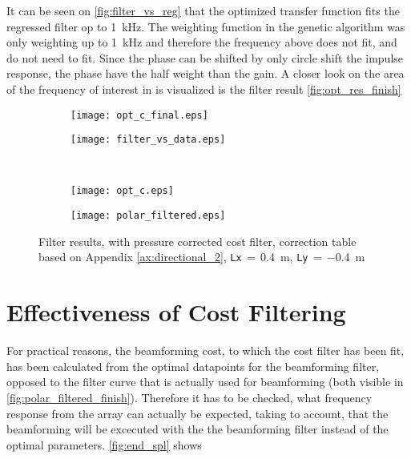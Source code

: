 It can be seen on \autoref{fig:filter_vs_reg} that the optimized transfer function fits the regressed filter op to \SI{1}{\kilo\hertz}. The weighting function in the genetic algorithm was only weighting up to \SI{1}{\kilo\hertz} and therefore the frequency above does not fit, and do not need to fit. Since the phase can be shifted by only circle shift the impulse response, the phase have the half weight than the gain.  A closer look on the area of the frequency of interest in is visualized is the filter result \autoref{fig:opt_res_finish}


\begin{figure}[H]
\begin{subfigure}[c]{0.5\textwidth}
\texttt{[image: opt\_c\_final.eps]}
\label{fig:opt_res_a_finish}
\end{subfigure}
\begin{subfigure}[c]{0.5\textwidth}
\texttt{[image: filter\_vs\_data.eps]}
\label{fig:filter_vs_data_finish}
\end{subfigure}\\
\hspace{0.1\textheight}
\begin{subfigure}[c]{0.5\textwidth}
\texttt{[image: opt\_c.eps]}
\label{fig:opt_res_c_finish}
\end{subfigure}
\begin{subfigure}[c]{0.5\textwidth}
\texttt{[image: polar\_filtered.eps]}
\label{fig:polar_filtered_finish}
\end{subfigure}
\caption{Filter results, with pressure corrected cost filter, correction table based on Appendix \ref{ax:directional_2}, \textcolor{green3}{\texttt{Lx}}\,$=$\,\SI{0.4}{\meter}, \textcolor{green3}{\texttt{Ly}}\,$=\,$\SI{-0.4}{\meter}}
		\label{fig:opt_res_finish}
\end{figure}


\section{Effectiveness of Cost Filtering} 
For practical reasons, the beamforming cost, to which the cost filter has been fit, has been calculated from the optimal datapoints for the beamforming filter, opposed to the filter curve that is actually used for beamforming (both visible in \autoref{fig:polar_filtered_finish}). Therefore it has to be checked, what frequency response from the array can actually be expected, taking to account, that the beamforming will be excecuted with the the beamforming filter instead of the optimal parameters. \autoref{fig:end_spl} shows 

